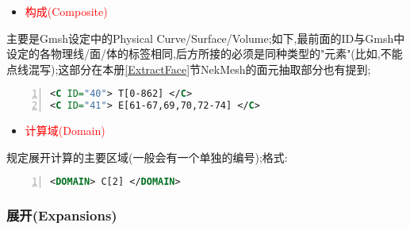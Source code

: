 \begin{itemize} \label{Composite}
	\item{\textcolor{red}{构成(Composite)}}
\end{itemize}
\par
主要是Gmsh设定中的Physical Curve/Surface/Volume;如下,最前面的ID与Gmsh中设定的各物理线/面/体的标签相同,后方所接的必须是同种类型的"元素"(比如,不能点线混写);这部分在本册\ref{ExtractFace}节NekMesh的面元抽取部分也有提到;\par
\begin{lstlisting}[frame=single,numbers=left,language=XML]
<C ID="40"> T[0-862] </C>
<C ID="41"> E[61-67,69,70,72-74] </C>
\end{lstlisting}
\par



\begin{itemize}
	\item{\textcolor{red}{计算域(Domain)}}
\end{itemize}

规定展开计算的主要区域(一般会有一个单独的编号);格式:\par
\begin{lstlisting}[frame=single,numbers=left,language=XML]
<DOMAIN> C[2] </DOMAIN>
\end{lstlisting}
\par

\subsubsection{展开(Expansions)}

